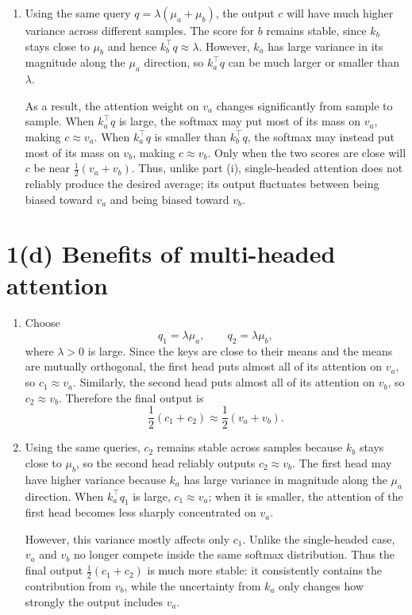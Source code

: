 \begin{answer}
\begin{enumerate}
    \item Using the same query $q = \lambda(\mu_a + \mu_b)$, the output $c$ will have much higher variance across different samples. The score for $b$ remains stable, since $k_b$ stays close to $\mu_b$ and hence $k_b^\top q \approx \lambda$. However, $k_a$ has large variance in its magnitude along the $\mu_a$ direction, so $k_a^\top q$ can be much larger or smaller than $\lambda$.

    As a result, the attention weight on $v_a$ changes significantly from sample to sample. When $k_a^\top q$ is large, the softmax may put most of its mass on $v_a$, making $c \approx v_a$. When $k_a^\top q$ is smaller than $k_b^\top q$, the softmax may instead put most of its mass on $v_b$, making $c \approx v_b$. Only when the two scores are close will $c$ be near $\frac{1}{2}(v_a + v_b)$. Thus, unlike part (i), single-headed attention does not reliably produce the desired average; its output fluctuates between being biased toward $v_a$ and being biased toward $v_b$.
\end{enumerate}
\section*{1(d) Benefits of multi-headed attention}
\begin{enumerate}
    \item Choose
    \[
        q_1 = \lambda \mu_a,
        \qquad
        q_2 = \lambda \mu_b,
    \]
    where $\lambda > 0$ is large. Since the keys are close to their means and the means are mutually orthogonal, the first head puts almost all of its attention on $v_a$, so $c_1 \approx v_a$. Similarly, the second head puts almost all of its attention on $v_b$, so $c_2 \approx v_b$. Therefore the final output is
    \[
        \frac{1}{2}(c_1 + c_2)
        \approx \frac{1}{2}(v_a + v_b).
    \]

    \item Using the same queries, $c_2$ remains stable across samples because $k_b$ stays close to $\mu_b$, so the second head reliably outputs $c_2 \approx v_b$. The first head may have higher variance because $k_a$ has large variance in magnitude along the $\mu_a$ direction. When $k_a^\top q_1$ is large, $c_1 \approx v_a$; when it is smaller, the attention of the first head becomes less sharply concentrated on $v_a$.

    However, this variance mostly affects only $c_1$. Unlike the single-headed case, $v_a$ and $v_b$ no longer compete inside the same softmax distribution. Thus the final output $\frac{1}{2}(c_1 + c_2)$ is much more stable: it consistently contains the contribution from $v_b$, while the uncertainty from $k_a$ only changes how strongly the output includes $v_a$.
\end{enumerate}


\end{answer}
